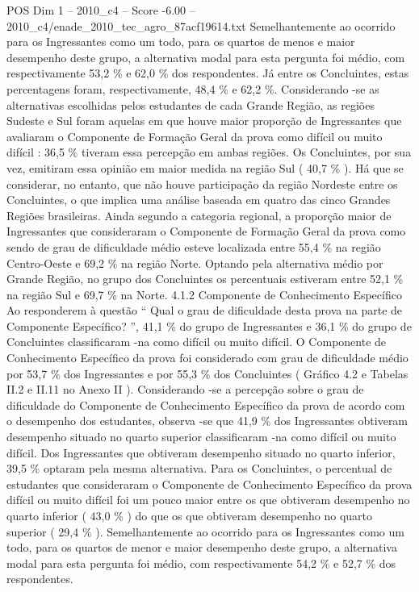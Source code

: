 \begin{textsample}{POS Dim 1 – 2010\_c4 – Score -6.00 – 2010\_c4/enade\_2010\_tec\_agro\_87acf19614.txt}
Semelhantemente ao ocorrido para os Ingressantes como um todo, para os quartos de menos e maior desempenho deste grupo, a alternativa modal para esta pergunta foi médio, com respectivamente 53,2 \% e 62,0 \% dos respondentes.
Já entre os Concluintes, estas percentagens foram, respectivamente, 48,4 \% e 62,2 \%.
Considerando -se as alternativas escolhidas pelos estudantes de cada Grande Região, as regiões Sudeste e Sul foram aquelas em que houve maior proporção de Ingressantes que avaliaram o Componente de Formação Geral da prova como difícil ou muito difícil : 36,5 \% tiveram essa percepção em ambas regiões.
Os Concluintes, por sua vez, emitiram essa opinião em maior medida na região Sul ( 40,7 \% ).
Há que se considerar, no entanto, que não houve participação da região Nordeste entre os Concluintes, o que implica uma análise baseada em quatro das cinco Grandes Regiões brasileiras.
Ainda segundo a categoria regional, a proporção maior de Ingressantes que consideraram o Componente de Formação Geral da prova como sendo de grau de dificuldade médio esteve localizada entre 55,4 \% na região Centro-Oeste e 69,2 \% na região Norte.
Optando pela alternativa médio por Grande Região, no grupo dos Concluintes os percentuais estiveram entre 52,1 \% na região Sul e 69,7 \% na Norte. 4.1.2 Componente de Conhecimento Específico Ao responderem à questão “ Qual o grau de dificuldade desta prova na parte de Componente Específico? ”, 41,1 \% do grupo de Ingressantes e 36,1 \% do grupo de Concluintes classificaram -na como difícil ou muito difícil.
O Componente de Conhecimento Específico da prova foi considerado com grau de dificuldade médio por 53,7 \% dos Ingressantes e por 55,3 \% dos Concluintes ( Gráfico 4.2 e Tabelas II.2 e II.11 no Anexo II ).
Considerando -se a percepção sobre o grau de dificuldade do Componente de Conhecimento Específico da prova de acordo com o desempenho dos estudantes, observa -se que 41,9 \% dos Ingressantes obtiveram desempenho situado no quarto superior classificaram -na como difícil ou muito difícil.
Dos Ingressantes que obtiveram desempenho situado no quarto inferior, 39,5 \% optaram pela mesma alternativa.
Para os Concluintes, o percentual de estudantes que consideraram o Componente de Conhecimento Específico da prova difícil ou muito difícil foi um pouco maior entre os que obtiveram desempenho no quarto inferior ( 43,0 \% ) do que os que obtiveram desempenho no quarto superior ( 29,4 \% ).
Semelhantemente ao ocorrido para os Ingressantes como um todo, para os quartos de menor e maior desempenho deste grupo, a alternativa modal para esta pergunta foi médio, com respectivamente 54,2 \% e 52,7 \% dos respondentes.

\end{textsample}
